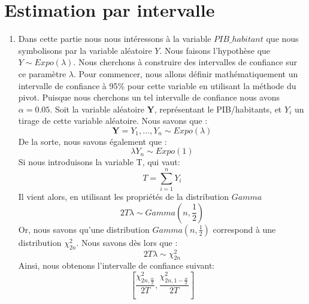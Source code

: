 \documentclass[a4paper, 11pt]{article}
\begin{document}
\section{Estimation par intervalle}
\begin{enumerate}[label=(\alph*)]
    \item Dans cette partie nous nous intéressons à la variable $PIB\_habitant$ que nous symbolisons par la variable aléatoire $Y$. Nous faisons l'hypothèse que $Y\sim Expo(\lambda)$. Nous cherchons à construire des intervalles de confiance sur ce paramètre $\lambda$. Pour commencer, nous allons définir mathématiquement un intervalle de confiance à 95$\%$ pour cette variable en utilisant la méthode du pivot. Puisque nous cherchons un tel intervalle de confiance nous avons $\alpha=0.05$. Soit la variable aléatoire $\textbf{Y}$, représentant le PIB/habitants, et $Y_i$ un tirage de cette variable aléatoire. Nous savons que :
    $$\textbf{Y}=Y_1,...,Y_n\sim Expo(\lambda)$$
    De la sorte, nous savons également que :
    $$\lambda Y_n\sim Expo(1)$$
    Si nous introduisons la variable T, qui vaut:
    $$T=\sum_{i=1}^n Y_i$$
    Il vient alors, en utilisant les propriétés de la distribution $Gamma$
    $$2T\lambda\sim Gamma(n,\frac{1}{2})$$
    Or, nous savons qu'une distribution $Gamma(n,\frac{1}{2})$ correspond à une distribution $\chi_{2n}^2$. Nous savons dès lors que : 
    $$ 2T\lambda\sim \chi_{2n}^2$$
    Ainsi, nous obtenons l'intervalle de confiance suivant:
    $$\left[\frac{\chi^2_{2n,\frac{\alpha}{2}}}{2T},\frac{\chi^2_{2n,1-\frac{\alpha}{2}}}{2T}\right]$$
    

\end{enumerate}
\end{document}
